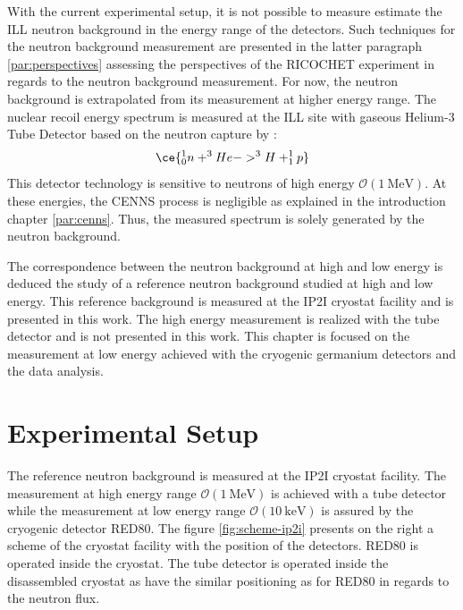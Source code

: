 With the current experimental setup, it is not possible to measure estimate the ILL neutron background in the energy range of the detectors. Such techniques for the neutron background measurement are presented in the latter paragraph \ref{par:perspectives} assessing the perspectives of the RICOCHET experiment in regards to the neutron background measurement.
For now, the neutron background is extrapolated from its measurement at higher energy range.
The nuclear recoil energy spectrum is measured at the ILL site with gaseous Helium-3 Tube Detector based on the neutron capture by :
\begin{equation}
	\ce{^1_0n + ^3He -> ^3H + ^1_1p}
\end{equation}
This detector technology is sensitive to neutrons of high energy $\mathcal{O}(\SI{1}{\mega\eV})$. At these energies, the CENNS process is negligible as explained in the introduction chapter \ref{par:cenns}. Thus, the measured spectrum is solely generated by the neutron background.

The correspondence between the neutron background at high and low energy is deduced the study of a reference neutron background studied at high and low energy. This reference background is measured at the IP2I cryostat facility and is presented in this work. The high energy measurement is realized with the  tube detector and is not presented in this work. This chapter is focused on the measurement at low energy achieved with the cryogenic germanium detectors and the data analysis.
%

\section{Experimental Setup}

The reference neutron background is measured at the IP2I cryostat facility. The measurement at high energy range $\mathcal{O}(\SI{1}{\mega\eV})$ is achieved with a  tube detector while the measurement at low energy range $\mathcal{O}(\SI{10}{\kilo\eV})$ is assured by the cryogenic detector RED80. The figure \ref{fig:scheme-ip2i} presents on the right a scheme of the cryostat facility with the position of the detectors. RED80 is operated inside the cryostat. The  tube detector is operated inside the disassembled cryostat as have the similar positioning as for RED80 in regards to the neutron flux. 

